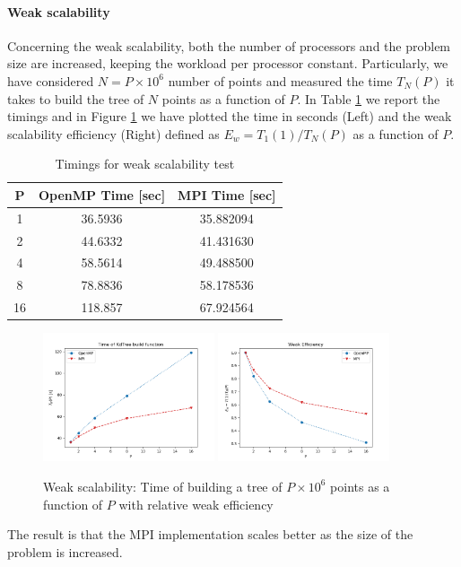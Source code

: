 \documentclass[amssymb, aps,nofootinbib, superscriptaddress, notitlepage]{revtex4}
\begin{document}
\paragraph*{Weak scalability}
Concerning the weak scalability,  both the number of processors and the problem size are increased, keeping the workload per processor constant.
Particularly, we have considered $N=P\times 10^6$ number of points and measured the time $T_N(P)$ it takes  to build the tree of $N$ points as a function of $P$. 
In Table \ref{table2} we report the timings  and in Figure \ref{Weak}  we have plotted the time in seconds (Left) and the weak scalability efficiency (Right) defined as $E_w=T_1(1)/T_N(P)$ as a function of $P$. 

\begin{table}[h!]
\centering
\begin{tabular}{|c|c|c|}
\hline 
P & OpenMP Time [sec] &  MPI Time [sec] \\ 
\hline 
1 & 36.5936 & 35.882094 \\ 
\hline 
2 & 44.6332 & 41.431630 \\ 
\hline 
4 & 58.5614 & 49.488500 \\ 
\hline 
8 & 78.8836& 58.178536 \\ 
\hline 
16  & 118.857 & 67.924564 \\ 
\hline 
\end{tabular} 
\caption{Timings for weak scalability test}
\label{table2}
\end{table}


\begin{figure}
  \centering
      \includegraphics[width=0.45\textwidth]{img/Weak_time.png}
      \includegraphics[width=0.45\textwidth]{img/Weak_speedup.png}
 \caption{Weak scalability: Time of building a tree of $P\times 10^6$ points as a function of $P$ with relative weak  efficiency}
\label{Weak}
\end{figure}
The result is that the MPI implementation scales better as the size of the problem is increased.
\end{document}
